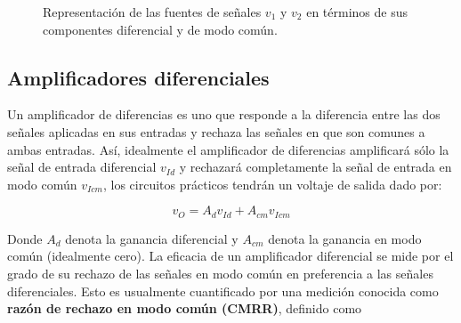 \documentclass[12pt]{article}
\begin{document}
	\begin{figure}[H]
		\centering	
		\caption{Representación de las fuentes de señales $v_1$ y $v_2$ en términos de sus componentes diferencial y de modo común.}	
		\label{fig:figura2}
	\end{figure}
	
	\subsection*{Amplificadores diferenciales}
	Un amplificador de diferencias es uno que responde a la diferencia entre las dos señales aplicadas en sus entradas y rechaza las señales en que son comunes a ambas entradas. Así, idealmente el amplificador de diferencias amplificará sólo la señal de entrada diferencial $v_{Id}$ y rechazará completamente la señal de entrada en modo común $v_{Icm}$, los circuitos prácticos tendrán un voltaje de salida dado por:
	
	\begin{tcolorbox}[colback=red!5!white,colframe=red!75!black,arc=0mm,boxrule=0mm,width=(\linewidth+0.5cm)]
		\begin{equation}
			v_O = A_d v_{Id} + A_{cm} v_{Icm}
		\end{equation}
	\end{tcolorbox}
	
	Donde $A_d$ denota la ganancia diferencial y $A_{cm}$ denota la ganancia en modo común (idealmente cero). La eficacia de un amplificador diferencial se mide por el grado de su rechazo de las señales en modo común en preferencia a las señales diferenciales. Esto es usualmente cuantificado por una medición conocida como \textbf{razón de rechazo en modo común (CMRR)}, definido como
	
\end{document}
